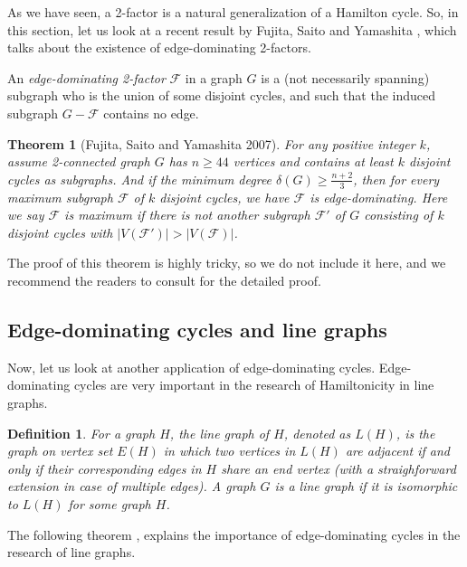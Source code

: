 \documentclass[12pt]{report}
\newtheorem{theorem}{Theorem}
\newtheorem{definition}{Definition}
\begin{document}
As we have seen, a 2-factor is a natural generalization of a Hamilton cycle. So, in this section, let us look at a recent result by Fujita, Saito and Yamashita \cite{fujita2007edge}, which talks about the existence of edge-dominating 2-factors.

An {\em edge-dominating 2-factor} $\mathcal{F}$ in a graph $G$ is a (not necessarily spanning) subgraph who is the union of some disjoint cycles, and such that the induced subgraph $G-\mathcal{F}$ contains no edge.

\begin{theorem}[Fujita, Saito and Yamashita 2007]\label{thmed2f1}
For any positive integer $k$, assume 2-connected graph $G$ has $n\ge44$ vertices and contains at least $k$ disjoint cycles as subgraphs. And if the minimum degree $\delta(G)\ge\frac{n+2}{3}$, then for every maximum subgraph $\mathcal{F}$ of $k$ disjoint cycles, we have $\mathcal{F}$ is edge-dominating. Here we say $\mathcal{F}$ is maximum if there is not another subgraph $\mathcal{F}'$ of $G$ consisting of $k$ disjoint cycles with $|V(\mathcal{F}')|>|V(\mathcal{F})|$.
\end{theorem}

The proof of this theorem is highly tricky, so we do not include it here, and we recommend the readers to consult \cite{fujita2007edge} for the detailed proof.









\subsection{Edge-dominating cycles and line graphs}
Now, let us look at another application of edge-dominating cycles. Edge-dominating cycles are very important in the research of Hamiltonicity in line graphs.

\begin{definition}
For a graph $H$, the line graph of $H$, denoted as $L(H)$, is the graph on vertex set $E(H)$ in which two vertices in $L(H)$ are adjacent if and only if their corresponding edges in $H$ share an end vertex (with a straighforward extension in case of multiple edges).
A graph $G$ is a line graph if it is isomorphic to $L(H)$ for some graph $H$.
\end{definition}


The following theorem \cite{harary1965eulerian}, explains the importance of edge-dominating cycles in the research of line graphs.
\end{document}

